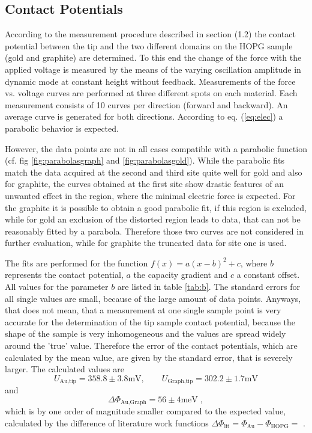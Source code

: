 \documentclass[a4paper]{scrartcl}
\numberwithin{equation}{section}
\numberwithin{figure}{section}
\numberwithin{table}{section}
\newcommand{\eq}[2]{\begin{equation}#1\label{#2}\end{equation}}
\newcommand{\Formel}[1]{(\ref{#1})}
\begin{document}
\subsection{Contact Potentials}
According to the measurement procedure described in section \textrm{(1.2)} the contact potential between the tip and the two different domains on the HOPG sample (gold and graphite) are determined. To this end the change of the force with the applied voltage is measured by the means of the varying oscillation amplitude in dynamic mode at constant height without feedback. Measurements of the force vs. voltage curves are performed at three different spots on each material. Each measurement consists of 10 curves per direction (forward and backward). An average curve is generated for both directions. According to eq. \Formel{eq:elec} a parabolic behavior is expected. 

However, the data points are not in all cases compatible with a parabolic function (cf. fig \ref{fig:parabolasgraph} and \ref{fig:parabolasgold}). While the parabolic fits match the data acquired at the second and third site quite well for gold and also for graphite, the curves obtained at the first site show drastic features of an unwanted effect in the region, where the minimal electric force is expected. For the graphite it is possible to obtain a good parabolic fit, if this region is excluded, while for gold an exclusion of the distorted region leads to data, that can not be reasonably fitted by a parabola. Therefore those two curves are not considered in further evaluation, while for graphite the truncated data for site one is used. 

The fits are performed for the function $f(x) = a(x-b)^2 + c$, where $b$ represents the contact potential, $a$ the capacity gradient and $c$ a constant offset. All values for the parameter $b$ are listed in table \ref{tab:b}. The standard errors for all single values are small, because of the large amount of data points. Anyways, that does not mean, that a measurement at one single sample point is very accurate for the determination of the tip sample contact potential, because the shape of the sample is very inhomogeneous and the values are spread widely around the 'true' value. Therefore the error of the contact potentials, which are calculated by the mean value, are given by the standard error, that is severely larger. The calculated values are
\eq{U_\text{Au,tip}= 358.8 \pm 3.8 \text{mV}, \qquad  U_\text{Graph,tip} = 302.2 \pm 1.7 \text{mV}}{}
 and 
 \eq{ \Delta \Phi_\text{Au,Graph} = 56 \pm 4 \text{meV} \; , }{}
which is by one order of magnitude smaller compared to the expected value, calculated by the difference of literature work functions $\Delta \Phi_\text{lit}=\Phi_\text{Au} - \Phi_\text{HOPG} = $ \cite{}.


\clearpage
 

\end{document}
